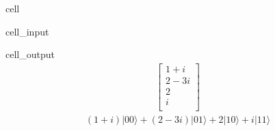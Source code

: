 \documentclass[letterpaper,10pt,english]{jupyterBook}
\begin{document}
\begin{sphinxuseclass}{cell}\begin{sphinxVerbatimInput}

\begin{sphinxuseclass}{cell_input}
\begin{sphinxVerbatim}[commandchars=\\\{\}]
   

\PYG{p}{[}\PYG{p}{[}  \PYG{p}{]}\PYG{p}{[}\PYG{p}{]}\PYG{p}{[}\PYG{p}{]}\PYG{p}{[}\PYG{p}{]}\PYG{p}{]}
 
\end{sphinxVerbatim}

\end{sphinxuseclass}\end{sphinxVerbatimInput}
\begin{sphinxVerbatimOutput}

\begin{sphinxuseclass}{cell_output}\begin{equation*}
\begin{split}\begin{bmatrix}
1 + i  \\
 2 - 3 i  \\
 2  \\
 i  \\
 \end{bmatrix}
\end{split}
\end{equation*}\begin{equation*}
\begin{split}(1 + i) |00\rangle+(2 - 3 i) |01\rangle+2 |10\rangle+i |11\rangle\end{split}
\end{equation*}
\end{sphinxuseclass}\end{sphinxVerbatimOutput}

\end{sphinxuseclass}
\end{document}
